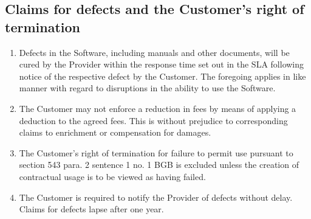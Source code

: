 \documentclass{terms}
\begin{document}
\subsection{Claims for defects and the Customer's right of termination}
\begin{enumerate}
\item Defects in the Software, including manuals and other documents, will be cured by the Provider within the response time set out in the SLA following notice of the respective defect by the Customer.
      The foregoing applies in like manner with regard to disruptions in the ability to use the Software.
\item The Customer may not enforce a reduction in fees by means of applying a deduction to the agreed fees.
      This is without prejudice to corresponding claims to enrichment or compensation for damages.
\item The Customer's right of termination for failure to permit use pursuant to section 543 para. 2 sentence 1 no. 1 BGB is excluded unless the creation of contractual usage is to be viewed as having failed.
\item The Customer is required to notify the Provider of defects without delay.
      Claims for defects lapse after one year.
\end{enumerate}
\end{document}

